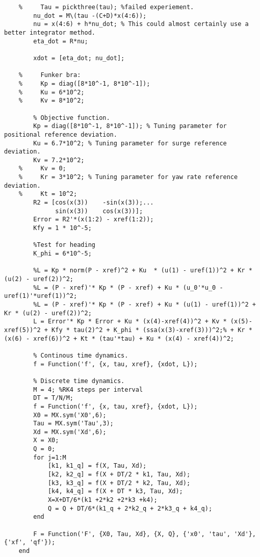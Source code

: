 \begin{lstlisting}
    %     Tau = pickthree(tau); %failed experiement.
        nu_dot = M\(tau -(C+D)*x(4:6)); 
        nu = x(4:6) + h*nu_dot; % This could almost certainly use a better integrator method.
        eta_dot = R*nu;
        
        xdot = [eta_dot; nu_dot];
        
    %     Funker bra:
    %     Kp = diag([8*10^-1, 8*10^-1]);
    %     Ku = 6*10^2;
    %     Kv = 8*10^2;
        
        % Objective function.
        Kp = diag([8*10^-1, 8*10^-1]); % Tuning parameter for positional reference deviation.
        Ku = 6.7*10^2; % Tuning parameter for surge reference deviation.
        Kv = 7.2*10^2;
    %     Kv = 0;
    %     Kr = 3*10^2; % Tuning parameter for yaw rate reference deviation.
    %     Kt = 10^2;
        R2 = [cos(x(3))    -sin(x(3));...
              sin(x(3))    cos(x(3))];
        Error = R2'*(x(1:2) - xref(1:2));
        Kfy = 1 * 10^-5;
    
        %Test for heading
        K_phi = 6*10^-5;
    
        %L = Kp * norm(P - xref)^2 + Ku  * (u(1) - uref(1))^2 + Kr * (u(2) - uref(2))^2;
        %L = (P - xref)'* Kp * (P - xref) + Ku * (u_0'*u_0 - uref(1)'*uref(1))^2;
        %L = (P - xref)'* Kp * (P - xref) + Ku * (u(1) - uref(1))^2 + Kr * (u(2) - uref(2))^2;
        L = Error'* Kp * Error + Ku * (x(4)-xref(4))^2 + Kv * (x(5)-xref(5))^2 + Kfy * tau(2)^2 + K_phi * (ssa(x(3)-xref(3)))^2;% + Kr * (x(6) - xref(6))^2 + Kt * (tau'*tau) + Ku * (x(4) - xref(4))^2;
        
        % Continous time dynamics.
        f = Function('f', {x, tau, xref}, {xdot, L});
        
        % Discrete time dynamics.
        M = 4; %RK4 steps per interval
        DT = T/N/M;
        f = Function('f', {x, tau, xref}, {xdot, L});
        X0 = MX.sym('X0',6);
        Tau = MX.sym('Tau',3);
        Xd = MX.sym('Xd',6);
        X = X0;
        Q = 0;
        for j=1:M
            [k1, k1_q] = f(X, Tau, Xd);
            [k2, k2_q] = f(X + DT/2 * k1, Tau, Xd);
            [k3, k3_q] = f(X + DT/2 * k2, Tau, Xd);
            [k4, k4_q] = f(X + DT * k3, Tau, Xd);
            X=X+DT/6*(k1 +2*k2 +2*k3 +k4);
            Q = Q + DT/6*(k1_q + 2*k2_q + 2*k3_q + k4_q);
        end
        
        F = Function('F', {X0, Tau, Xd}, {X, Q}, {'x0', 'tau', 'Xd'}, {'xf', 'qf'});
    end
        
\end{lstlisting}

